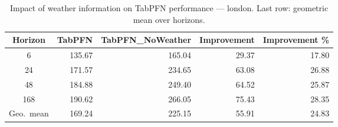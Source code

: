 \begin{table}
\centering
\caption{Impact of weather information on TabPFN performance — london. Last row: geometric mean over horizons.}
\label{tab:tabpfn_weather_london}
\begin{tabular}{crrrr}
\toprule
Horizon & TabPFN & TabPFN\_NoWeather & Improvement & Improvement \% \\
\midrule
6 & 135.67 & 165.04 & 29.37 & 17.80 \\
24 & 171.57 & 234.65 & 63.08 & 26.88 \\
48 & 184.88 & 249.40 & 64.52 & 25.87 \\
168 & 190.62 & 266.05 & 75.43 & 28.35 \\
\midrule
Geo.\ mean & 169.24 & 225.15 & 55.91 & 24.83 \\
\bottomrule
\end{tabular}
\end{table}
